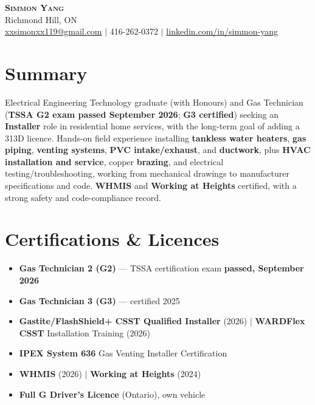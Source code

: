 \documentclass[letterpaper,11pt]{article}
\begin{document}
\begin{center}
    \textbf{\Huge \scshape Simmon Yang} \\ \vspace{1pt}
    Richmond Hill, ON \\
    \href{mailto:xxsimonxx119@gmail.com}{xxsimonxx119@gmail.com} $|$ 416-262-0372 $|$
    \href{https://www.linkedin.com/in/simmon-yang/}{linkedin.com/in/simmon-yang}
\end{center}

\section{Summary}
Electrical Engineering Technology graduate (with Honours) and Gas Technician (\textbf{TSSA G2 exam passed September 2026}; \textbf{G3 certified}) seeking an \textbf{Installer} role in residential home services, with the long-term goal of adding a 313D licence. Hands-on field experience installing \textbf{tankless water heaters}, \textbf{gas piping}, \textbf{venting systems}, \textbf{PVC intake/exhaust}, and \textbf{ductwork}, plus \textbf{HVAC installation and service}, copper \textbf{brazing}, and electrical testing/troubleshooting, working from mechanical drawings to manufacturer specifications and code. \textbf{WHMIS} and \textbf{Working at Heights} certified, with a strong safety and code-compliance record.

\section{Certifications \& Licences}
\begin{itemize}[leftmargin=0.15in]
  \item \textbf{Gas Technician 2 (G2)} --- TSSA certification exam \textbf{passed, September 2026}
  \item \textbf{Gas Technician 3 (G3)} --- certified 2025
  \item \textbf{Gastite/FlashShield+ CSST Qualified Installer} (2026) $|$ \textbf{WARDFlex CSST} Installation Training (2026)
  \item \textbf{IPEX System 636} Gas Venting Installer Certification
  \item \textbf{WHMIS} (2026) $|$ \textbf{Working at Heights} (2024)
  \item \textbf{Full G Driver's Licence} (Ontario), own vehicle
\end{itemize}
\end{document}
